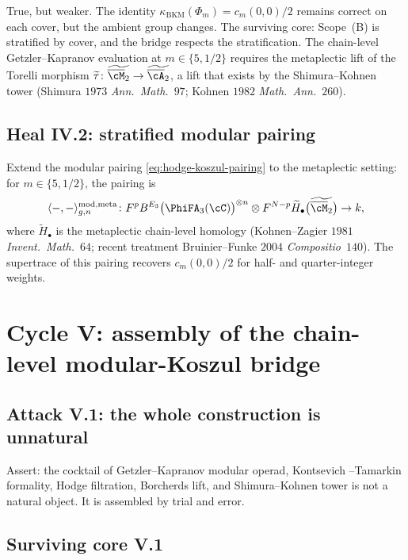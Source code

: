 True, but weaker. The identity $\kappa_{\mathrm{BKM}}(\Phi_m) = c_m(0, 0)/2$
remains correct on each cover, but the ambient group changes. The
surviving core: Scope~(B) is stratified by cover, and the bridge
respects the stratification. The chain-level Getzler--Kapranov
evaluation at $m \in \{5, 1/2\}$ requires the metaplectic lift of the
Torelli morphism $\widetilde{\tau} \colon \widetilde{\overline{\cM}_2} \to
\widetilde{\overline{\cA}_2}$, a lift that exists by the Shimura--Kohnen
tower (Shimura $1973$ \emph{Ann.\ Math.}\ $97$; Kohnen $1982$ \emph{Math.\
Ann.}\ $260$).

\subsection*{Heal IV.2: stratified modular pairing}

Extend the modular pairing \eqref{eq:hodge-koszul-pairing} to the
metaplectic setting: for $m \in \{5, 1/2\}$, the pairing is
\begin{equation}
\label{eq:modular-pairing-metaplectic}
 \langle -, - \rangle^{\mathrm{mod, meta}}_{g, n} \colon
 F^p B^{E_3}\bigl(\PhiFA_3(\cC)\bigr)^{\otimes n} \otimes
 F^{N - p} \widetilde{H}_\bullet\bigl(\widetilde{\overline{\cM}_2}\bigr) \to k,
\end{equation}
where $\widetilde{H}_\bullet$ is the metaplectic chain-level homology
(Kohnen--Zagier $1981$ \emph{Invent.\ Math.}\ $64$; recent treatment
Bruinier--Funke $2004$ \emph{Compositio}\ $140$). The supertrace of this
pairing recovers $c_m(0, 0)/2$ for half- and quarter-integer weights.


\section{Cycle V: assembly of the chain-level modular-Koszul bridge}
\label{sec:cycle-5-assembly}

\subsection*{Attack V.1: the whole construction is unnatural}

Assert: the cocktail of Getzler--Kapranov modular operad, Kontsevich
--Tamarkin formality, Hodge filtration, Borcherds lift, and
Shimura--Kohnen tower is not a natural object. It is assembled by
trial and error.

\subsection*{Surviving core V.1}

